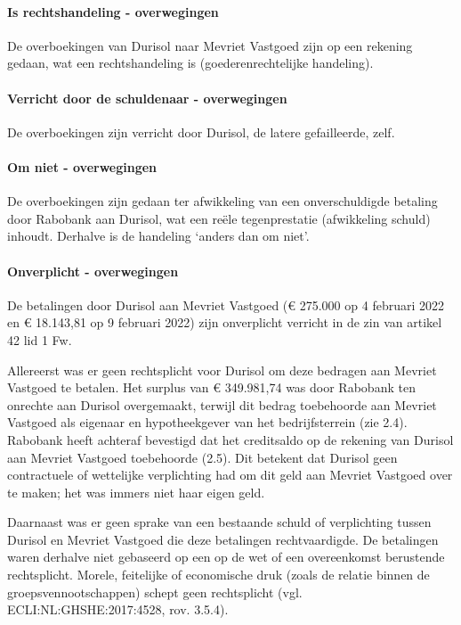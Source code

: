 \documentclass[
  dutch,
  a4paper,
]{article}
\begin{document}
\paragraph{Is rechtshandeling - overwegingen}\label{is-rechtshandeling---overwegingen-12}

De overboekingen van Durisol naar Mevriet Vastgoed zijn op een rekening gedaan, wat een rechtshandeling is (goederenrechtelijke handeling).

\paragraph{Verricht door de schuldenaar - overwegingen}\label{verricht-door-de-schuldenaar---overwegingen-12}

De overboekingen zijn verricht door Durisol, de latere gefailleerde, zelf.

\paragraph{Om niet - overwegingen}\label{om-niet---overwegingen-12}

De overboekingen zijn gedaan ter afwikkeling van een onverschuldigde betaling door Rabobank aan Durisol, wat een reële tegenprestatie (afwikkeling schuld) inhoudt. Derhalve is de handeling `anders dan om niet'.

\paragraph{Onverplicht - overwegingen}\label{onverplicht---overwegingen-12}

De betalingen door Durisol aan Mevriet Vastgoed (€ 275.000 op 4 februari 2022 en € 18.143,81 op 9 februari 2022) zijn onverplicht verricht in de zin van artikel 42 lid 1 Fw.

Allereerst was er geen rechtsplicht voor Durisol om deze bedragen aan Mevriet Vastgoed te betalen. Het surplus van € 349.981,74 was door Rabobank ten onrechte aan Durisol overgemaakt, terwijl dit bedrag toebehoorde aan Mevriet Vastgoed als eigenaar en hypotheekgever van het bedrijfsterrein (zie 2.4). Rabobank heeft achteraf bevestigd dat het creditsaldo op de rekening van Durisol aan Mevriet Vastgoed toebehoorde (2.5). Dit betekent dat Durisol geen contractuele of wettelijke verplichting had om dit geld aan Mevriet Vastgoed over te maken; het was immers niet haar eigen geld.

Daarnaast was er geen sprake van een bestaande schuld of verplichting tussen Durisol en Mevriet Vastgoed die deze betalingen rechtvaardigde. De betalingen waren derhalve niet gebaseerd op een op de wet of een overeenkomst berustende rechtsplicht. Morele, feitelijke of economische druk (zoals de relatie binnen de groepsvennootschappen) schept geen rechtsplicht (vgl. ECLI:NL:GHSHE:2017:4528, rov. 3.5.4).
\end{document}

